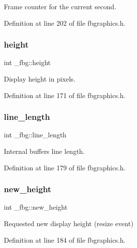 Frame counter for the current second. 



Definition at line 202 of file fbgraphics.\+h.

\mbox{\label{struct__fbg_a3a3bd409e71d020fa77f69a541d832f8}} 
\subsubsection{\texorpdfstring{height}{height}}
{\footnotesize\ttfamily int \+\_\+fbg\+::height}



Display height in pixels. 



Definition at line 171 of file fbgraphics.\+h.

\mbox{\label{struct__fbg_af8a1ee8d7004e6f2193f2a3ed98f8ce8}} 
\subsubsection{\texorpdfstring{line\+\_\+length}{line\_length}}
{\footnotesize\ttfamily int \+\_\+fbg\+::line\+\_\+length}



Internal buffers line length. 



Definition at line 179 of file fbgraphics.\+h.

\mbox{\label{struct__fbg_a509aa5f8f0a94d8313bb4da777aa64bc}} 
\subsubsection{\texorpdfstring{new\+\_\+height}{new\_height}}
{\footnotesize\ttfamily int \+\_\+fbg\+::new\+\_\+height}



Requested new display height (resize event) 



Definition at line 184 of file fbgraphics.\+h.

